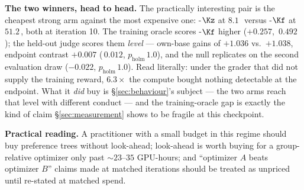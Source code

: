 \textbf{The two winners, head to head.} The practically interesting pair is the cheapest strong
arm against the most expensive one: \PTO-$\Kz$ at $8.1$\,\gpuh\ versus \GRPO-$\Kf$ at
$51.2$\,\gpuh, both at iteration 10. The training oracle scores \GRPO-$\Kf$ higher ($+0.257$,
\dz\,$0.492$); the held-out judge scores them \emph{level} --- own-base gains of $+1.036$ vs.\
$+1.038$, endpoint contrast $+0.007$ (\dz\,$0.012$, $p_{\text{holm}}\,1.0$), and the null
replicates on the second evaluation draw ($-0.022$, $p_{\text{holm}}\,1.0$). Read literally:
under the grader that did not supply the training reward, $6.3\times$ the compute bought nothing
detectable at the endpoint. What it \emph{did} buy is \S\ref{sec:behaviour}'s subject --- the two
arms reach that level with different conduct --- and the training-oracle gap is exactly the kind
of claim \S\ref{sec:measurement} shows to be fragile at this checkpoint.

\textbf{Practical reading.} A practitioner with a small budget in this regime should buy
preference trees without look-ahead; look-ahead is worth buying for a group-relative optimizer
only past ${\sim}23$--$35$ GPU-hours; and ``optimizer $A$ beats optimizer $B$'' claims made at
matched iterations should be treated as unpriced until re-stated at matched spend.
